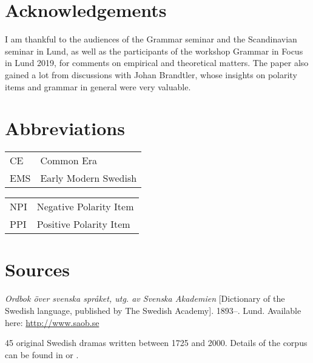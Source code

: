 \documentclass[output=paper]{langscibook}
\begin{document}
\section*{Acknowledgements}


I am thankful to the audiences of the Grammar seminar and the Scandinavian seminar in Lund, as well as the participants of the workshop Grammar in Focus in Lund 2019, for comments on empirical and theoretical matters. The paper also gained a lot from discussions with Johan Brandtler, whose insights on polarity items and grammar in general were very valuable.


\section*{Abbreviations}
\begin{tabularx}{.5\textwidth}{@{}lQ}
CE  &  Common Era                    \\
EMS  &  Early Modern Swedish         \\
\end{tabularx}\begin{tabularx}{.5\textwidth}{lQ@{}}
NPI &   Negative Polarity Item      \\
PPI &   Positive Polarity Item      \\
\end{tabularx}

\section*{Sources}
\begin{description}[font=\normalfont]
\item[SAOB:] \textit{Ordbok över svenska språket, utg. av Svenska Akademien} [Dictionary of the Swedish language, published by The Swedish Academy]. 1893–. Lund. Available here: \url{http://www.saob.se}
\item[The corpus of Swedish drama dialogue.] 45 original Swedish dramas written between 1725 and 2000. Details of the corpus can be found in \citealt{MarttalaStromquist2001} or \citealt{Stroh-Wollin2008}.
\end{description}



{\sloppy\printbibliography[heading=subbibliography,notkeyword=this]}
\end{document}
